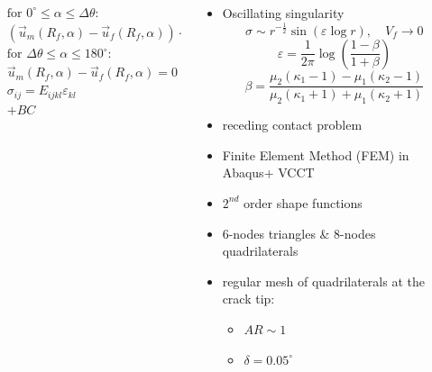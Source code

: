 \documentclass[first,firstsupp,lastsupp,last,hyperref,table]{ETHclass}
\begin{document}
\begin{frame}
\begin{columns}
\begin{column}{0.6\textwidth}
\begin{columns}
\begin{column}{0.7\columnwidth}
\begin{equation*}
\begin{aligned}
&\text{for } 0^{\circ}\leq\alpha\leq\Delta\theta:\\
&\left(\overrightarrow{u}_{m}\left(R_{f},\alpha\right)-\overrightarrow{u}_{f}\left(R_{f},\alpha\right)\right)\cdot\overrightarrow{n}_{\alpha}\geq 0\\
&\text{for } \Delta\theta\leq\alpha\leq 180^{\circ}:\\
&\overrightarrow{u}_{m}\left(R_{f},\alpha\right)-\overrightarrow{u}_{f}\left(R_{f},\alpha\right)=0\\
&\sigma_{ij}=E_{ijkl}\varepsilon_{kl}\\
&+BC
\end{aligned}
\end{equation*}
\end{column}
\end{columns}
\end{column}
\begin{column}{0.35\textwidth}
\scriptsize
\begin{itemize}[label=]
\item Oscillating singularity
\vspace{-0.25cm}
\begin{equation*}
\sigma\sim r^{-\frac{1}{2}}\sin\left(\varepsilon\log r\right),\quad V_{f}\rightarrow 0
\end{equation*}
{\tiny
\begin{equation*}
\varepsilon=\frac{1}{2\pi}\log\left(\frac{1-\beta}{1+\beta}\right)
\end{equation*}
\begin{equation*}
\beta=\frac{\mu_{2}\left(\kappa_{1}-1\right)-\mu_{1}\left(\kappa_{2}-1\right)}{\mu_{2}\left(\kappa_{1}+1\right)+\mu_{1}\left(\kappa_{2}+1\right)}
\end{equation*}}
\item receding contact problem
\item Finite Element Method (FEM) in Abaqus\texttrademark + VCCT
\item $2^{nd}$ order shape functions
\item 6-nodes triangles \& 8-nodes quadrilaterals
\item regular mesh of quadrilaterals at the crack tip:
\begin{itemize}[label=-]
\item $AR\sim 1$
\item $\delta=0.05^{\circ}$
\end{itemize}
\end{itemize}
\end{column}
\end{columns}
\end{frame}
\end{document}
